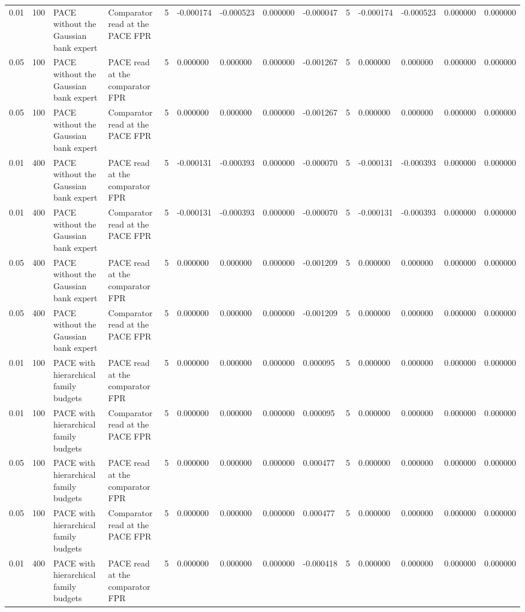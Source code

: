 \begin{tabular}{llllllllllllll}
0.01 & 100 & PACE without the Gaussian bank expert & Comparator read at the PACE FPR & 5 & -0.000174 & -0.000523 & 0.000000 & -0.000047 & 5 & -0.000174 & -0.000523 & 0.000000 & 0.000000 \\
0.05 & 100 & PACE without the Gaussian bank expert & PACE read at the comparator FPR & 5 & 0.000000 & 0.000000 & 0.000000 & -0.001267 & 5 & 0.000000 & 0.000000 & 0.000000 & 0.000000 \\
0.05 & 100 & PACE without the Gaussian bank expert & Comparator read at the PACE FPR & 5 & 0.000000 & 0.000000 & 0.000000 & -0.001267 & 5 & 0.000000 & 0.000000 & 0.000000 & 0.000000 \\
0.01 & 400 & PACE without the Gaussian bank expert & PACE read at the comparator FPR & 5 & -0.000131 & -0.000393 & 0.000000 & -0.000070 & 5 & -0.000131 & -0.000393 & 0.000000 & 0.000000 \\
0.01 & 400 & PACE without the Gaussian bank expert & Comparator read at the PACE FPR & 5 & -0.000131 & -0.000393 & 0.000000 & -0.000070 & 5 & -0.000131 & -0.000393 & 0.000000 & 0.000000 \\
0.05 & 400 & PACE without the Gaussian bank expert & PACE read at the comparator FPR & 5 & 0.000000 & 0.000000 & 0.000000 & -0.001209 & 5 & 0.000000 & 0.000000 & 0.000000 & 0.000000 \\
0.05 & 400 & PACE without the Gaussian bank expert & Comparator read at the PACE FPR & 5 & 0.000000 & 0.000000 & 0.000000 & -0.001209 & 5 & 0.000000 & 0.000000 & 0.000000 & 0.000000 \\
0.01 & 100 & PACE with hierarchical family budgets & PACE read at the comparator FPR & 5 & 0.000000 & 0.000000 & 0.000000 & 0.000095 & 5 & 0.000000 & 0.000000 & 0.000000 & 0.000000 \\
0.01 & 100 & PACE with hierarchical family budgets & Comparator read at the PACE FPR & 5 & 0.000000 & 0.000000 & 0.000000 & 0.000095 & 5 & 0.000000 & 0.000000 & 0.000000 & 0.000000 \\
0.05 & 100 & PACE with hierarchical family budgets & PACE read at the comparator FPR & 5 & 0.000000 & 0.000000 & 0.000000 & 0.000477 & 5 & 0.000000 & 0.000000 & 0.000000 & 0.000000 \\
0.05 & 100 & PACE with hierarchical family budgets & Comparator read at the PACE FPR & 5 & 0.000000 & 0.000000 & 0.000000 & 0.000477 & 5 & 0.000000 & 0.000000 & 0.000000 & 0.000000 \\
0.01 & 400 & PACE with hierarchical family budgets & PACE read at the comparator FPR & 5 & 0.000000 & 0.000000 & 0.000000 & -0.000418 & 5 & 0.000000 & 0.000000 & 0.000000 & 0.000000 \\

\end{tabular}

